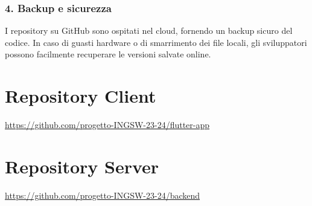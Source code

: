 \subsubsection*{4. Backup e sicurezza}
I repository su GitHub sono ospitati nel cloud, fornendo un backup sicuro del codice. In caso di guasti hardware o di smarrimento dei file locali, gli sviluppatori possono facilmente recuperare le versioni salvate online.

\section{Repository Client}
\url{https://github.com/progetto-INGSW-23-24/flutter-app}

\section{Repository Server}
\url{https://github.com/progetto-INGSW-23-24/backend}

